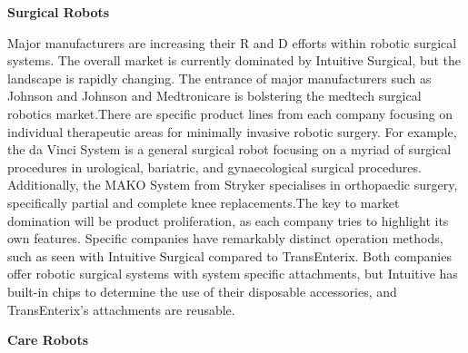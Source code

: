 \documentclass[12pt,a4paper]{report}
\begin{document}
\begin{center}
  \small{\textbf{Surgical Robots}}
\end{center}

Major manufacturers are increasing their R and D efforts within robotic surgical systems. The overall market is currently dominated by Intuitive Surgical, but the landscape is rapidly changing. The entrance of major manufacturers such as Johnson  and  Johnson and Medtronicare is bolstering the medtech surgical robotics market.There are specific product lines from each company focusing on individual therapeutic areas for minimally invasive robotic surgery. For example, the da Vinci System is a general surgical robot focusing on a myriad of surgical procedures in urological, bariatric, and gynaecological surgical procedures. Additionally, the MAKO System from Stryker specialises in orthopaedic surgery, specifically partial and complete knee replacements.The key to market domination will be product proliferation, as each company tries to highlight its own features. Specific companies have remarkably distinct operation methods, such as seen with Intuitive Surgical compared to TransEnterix. Both companies offer robotic surgical systems with system specific attachments, but Intuitive has built-in chips to determine the use of their disposable accessories, and TransEnterix’s attachments are reusable.\par

\begin{center}
  \small{\textbf{Care Robots}}
\end{center}
\end{document}
